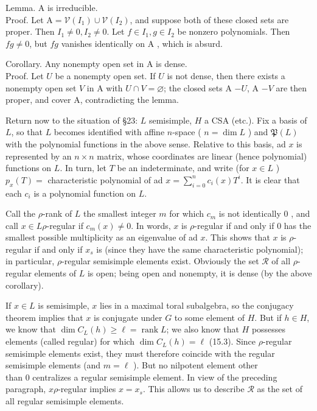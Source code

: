 \documentclass[10pt]{article}
\begin{document}
Lemma. A is irreducible.\\
Proof. Let $\mathrm{A}=\mathscr{V}\left(I_{1}\right) \cup \mathscr{V}\left(I_{2}\right)$, and suppose both of these closed sets are proper. Then $I_{1} \neq 0, I_{2} \neq 0$. Let $f \in I_{1}, g \in I_{2}$ be nonzero polynomials. Then $f g \neq 0$, but $f g$ vanishes identically on A , which is absurd.

Corollary. Any nonempty open set in A is dense.\\
Proof. Let $U$ be a nonempty open set. If $U$ is not dense, then there exists a nonempty open set $V$ in A with $U \cap V=\varnothing$; the closed sets A $-U$, A $-V$ are then proper, and cover A, contradicting the lemma.

Return now to the situation of §23: $L$ semisimple, $H$ a CSA (etc.). Fix a basis of $L$, so that $L$ becomes identified with affine $n$-space ( $n=\operatorname{dim} L$ ) and $\mathfrak{P}(L)$ with the polynomial functions in the above sense. Relative to this basis, ad $x$ is represented by an $n \times n$ matrix, whose coordinates are linear (hence polynomial) functions on $L$. In turn, let $T$ be an indeterminate, and write (for $x \in L$ ) $p_{x}(T)=$ characteristic polynomial of ad $x=\sum_{i=0}^{n} c_{i}(x) T^{i}$. It is clear that each $c_{i}$ is a polynomial function on $L$.

Call the $\rho$-rank of $L$ the smallest integer $m$ for which $c_{m}$ is not identically 0 , and call $x \in L \rho$-regular if $c_{m}(x) \neq 0$. In words, $x$ is $\rho$-regular if and only if 0 has the smallest possible multiplicity as an eigenvalue of ad $x$. This shows that $x$ is $\rho$-regular if and only if $x_{s}$ is (since they have the same characteristic polynomial); in particular, $\rho$-regular semisimple elements exist. Obviously the set $\mathscr{R}$ of all $\rho$-regular elements of $L$ is open; being open and nonempty, it is dense (by the above corollary).

If $x \in L$ is semisimple, $x$ lies in a maximal toral subalgebra, so the conjugacy theorem implies that $x$ is conjugate under $G$ to some element of $H$. But if $h \in H$, we know that $\operatorname{dim} C_{L}(h) \geq \ell=\operatorname{rank} L$; we also know that $H$ possesses elements (called regular) for which $\operatorname{dim} C_{L}(h)=\ell$ (15.3). Since $\rho$-regular semisimple elements exist, they must therefore coincide with the regular semisimple elements (and $m=\ell$ ). But no nilpotent element other\\
than 0 centralizes a regular semisimple element. In view of the preceding paragraph, $x \rho$-regular implies $x=x_{s}$. This allows us to describe $\mathscr{R}$ as the set of all regular semisimple elements.
\end{document}
